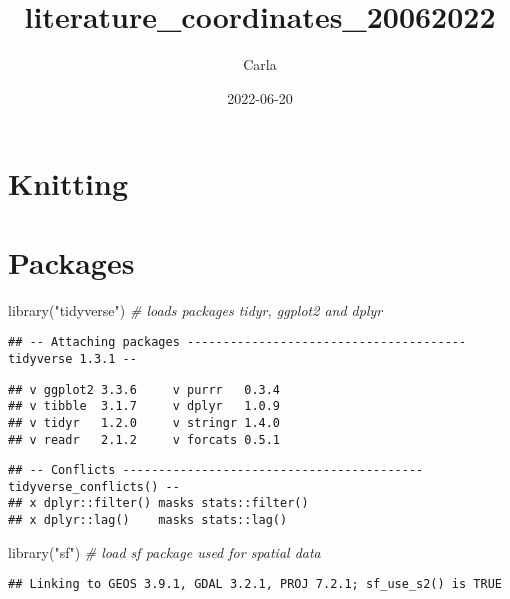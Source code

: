 \documentclass[
]{article}
\title{literature\_coordinates\_20062022}
\author{Carla}
\date{2022-06-20}
\newenvironment{Shaded}{\begin{snugshade}}{\end{snugshade}}
\newcommand{\CommentTok}[1]{\textcolor[rgb]{0.56,0.35,0.01}{\textit{#1}}}
\newcommand{\FunctionTok}[1]{\textcolor[rgb]{0.00,0.00,0.00}{#1}}
\newcommand{\NormalTok}[1]{#1}
\newcommand{\StringTok}[1]{\textcolor[rgb]{0.31,0.60,0.02}{#1}}
\begin{document}
\maketitle

\hypertarget{knitting}{%
\section{Knitting}\label{knitting}}

\hypertarget{packages}{%
\section{Packages}\label{packages}}

\begin{Shaded}
\begin{Highlighting}[]
\FunctionTok{library}\NormalTok{(}\StringTok{"tidyverse"}\NormalTok{) }\CommentTok{\# loads packages tidyr, ggplot2 and dplyr}
\end{Highlighting}
\end{Shaded}

\begin{verbatim}
## -- Attaching packages --------------------------------------- tidyverse 1.3.1 --
\end{verbatim}

\begin{verbatim}
## v ggplot2 3.3.6     v purrr   0.3.4
## v tibble  3.1.7     v dplyr   1.0.9
## v tidyr   1.2.0     v stringr 1.4.0
## v readr   2.1.2     v forcats 0.5.1
\end{verbatim}

\begin{verbatim}
## -- Conflicts ------------------------------------------ tidyverse_conflicts() --
## x dplyr::filter() masks stats::filter()
## x dplyr::lag()    masks stats::lag()
\end{verbatim}

\begin{Shaded}
\begin{Highlighting}[]
\FunctionTok{library}\NormalTok{(}\StringTok{"sf"}\NormalTok{) }\CommentTok{\# load sf package used for spatial data}
\end{Highlighting}
\end{Shaded}

\begin{verbatim}
## Linking to GEOS 3.9.1, GDAL 3.2.1, PROJ 7.2.1; sf_use_s2() is TRUE
\end{verbatim}
\end{document}
